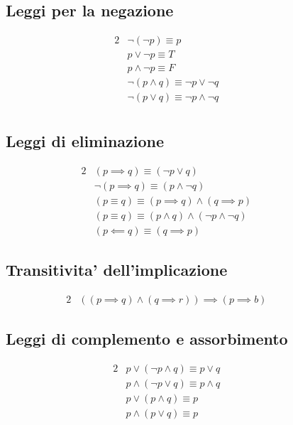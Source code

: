 \documentclass{report}
\newcommand{\AND}{\wedge}
\newcommand{\OR}{\vee}
\begin{document}
    \subsection{Leggi per la negazione}
    \begin{alignat*}{2}
        & \neg(\neg p) \equiv p                     \qquad &&\tag{doppia negazione} \\
        & p \OR \neg p \equiv T                     \qquad &&\tag{terzo escluso} \\
        & p \AND \neg p \equiv F                    \qquad &&\tag{contraddizione} \\
        & \neg (p \AND q) \equiv \neg p \OR \neg q  \qquad &&\tag{De Morgan} \\
        & \neg (p \OR q) \equiv \neg p \AND \neg q \\
    \end{alignat*}
    
    \subsection{Leggi di eliminazione}
    \begin{alignat*}{2}   
        & (p \implies q) \equiv (\neg p \OR q)                      \qquad &&\tag{elim-$\implies$} \\
        & \neg(p \implies q) \equiv (p \AND \neg q)                 \qquad &&\tag{elim-$\neg\implies$} \\
        & (p \equiv q) \equiv (p \implies q) \AND (q \implies p)    \qquad &&\tag{elim-$\equiv$} \\
        & (p \equiv q) \equiv (p \AND q) \AND (\neg p \AND \neg q)  \qquad &&\tag{elim-$\equiv$-bis} \\
        & (p \impliedby q) \equiv (q \implies p)                    \qquad &&\tag{elim-$\impliedby$}
    \end{alignat*} 

    \subsection{Transitivita' dell'implicazione}
    \begin{alignat*}{2}
        & ((p \implies q) \AND (q \implies r)) \implies (p \implies b)      \qquad &&\tag{transitivita'}        
    \end{alignat*}

    \subsection{Leggi di complemento e assorbimento}
    \begin{alignat}
        {2}
        & p \OR (\neg p \AND q) \equiv p \OR q      \qquad &&\tag{complemento}\\
        & p \AND (\neg p \OR q) \equiv p \AND q     \nonumber\\
        & p \OR (p \AND q) \equiv p                 \qquad &&\tag{assorbimento}\\
        & p \AND (p \OR q) \equiv p                 \nonumber
    \end{alignat}
\end{document}
